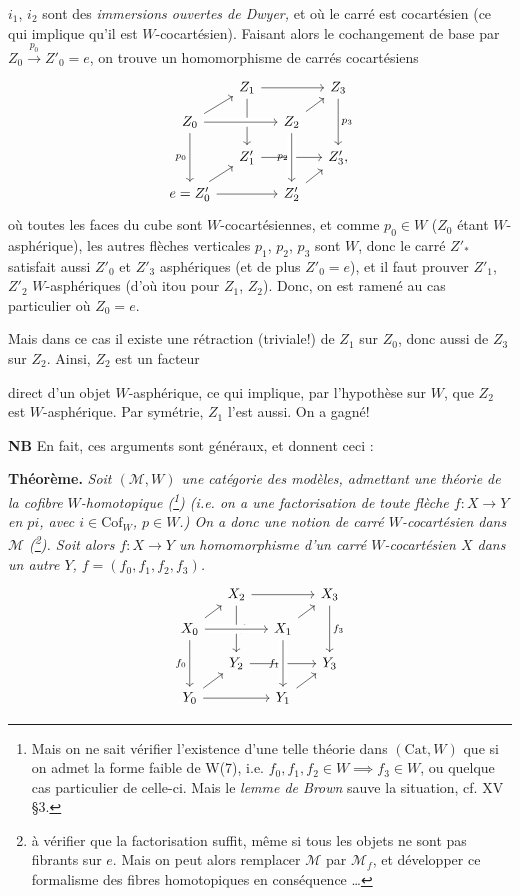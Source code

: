 \documentclass[11pt]{article}
\newcommand{\printedpage}[1]{\marginpar{\footnotesize p.~#1}}
\newcommand{\msp}[1]{\marginpar{\footnotesize [#1]}}
\newcommand{\Cof}{\mathrm{Cof}}
\begin{document}
$i_1$, $i_2$ sont des \textit{immersions ouvertes de Dwyer,} et où le carré est cocartésien (ce qui implique qu'il est $W$-cocartésien). Faisant alors le cochangement de base par $Z_0 \xrightarrow{p_0} Z'_0 = e$, on trouve un homomorphisme de carrés cocartésiens
\[
\begin{tikzcd}[column sep=small, row sep=small]
 & Z_1 \arrow[rr] \arrow[dd, "p_1"] & & Z_3 \arrow[dd, "p_3"] \\
Z_0 \arrow[ur] \arrow[rr, crossing over] \arrow[dd, "p_0"'] & & Z_2 \arrow[ur] & \\
 & Z'_1 \arrow[rr] & & Z'_3, \\
e = Z'_0 \arrow[ur] \arrow[rr] & & Z'_2 \arrow[ur] \arrow[from=uu, crossing over, "p_2"'] &
\end{tikzcd}
\]
où toutes les faces du cube sont $W$-cocartésiennes, et comme $p_0 \in W$ ($Z_0$ étant $W$-asphérique), les autres flèches verticales $p_1$, $p_2$, $p_3$ sont $W$, donc le carré $Z'_*$ satisfait aussi $Z'_0$ et $Z'_3$ asphériques (et de plus $Z'_0 = e$), et il faut prouver $Z'_1$, $Z'_2$ $W$-asphériques (d'où itou pour $Z_1$, $Z_2$). Donc, on est ramené au cas particulier où $Z_0 = e$.

Mais dans ce cas il existe une rétraction (triviale!) de $Z_1$ sur $Z_0$, donc aussi de $Z_3$ sur $Z_2$. Ainsi, $Z_2$ est un facteur

\msp{page 272}

direct d'un objet $W$-asphérique, ce qui implique, par l'hypothèse sur $W$, que $Z_2$ est $W$-asphérique. Par symétrie, $Z_1$ l'est aussi. On a gagné!

\textbf{NB} En fait, ces arguments sont généraux, et donnent ceci :

\setcounter{footnote}{136}
\textbf{Théorème.} \textit{Soit $(\mathcal{M}, W)$ une catégorie des modèles, admettant une théorie de la cofibre $W$-homotopique \textup{(}\footnote{Mais on ne sait vérifier l'existence d'une telle théorie dans $(\mathrm{Cat}, W)$ que si on admet la forme faible de W(7), i.e. $f_0, f_1, f_2 \in W \implies f_3 \in W$, ou quelque cas particulier de celle-ci. Mais le \textit{lemme de Brown} sauve la situation, cf. XV \S3.}\textup{)} (i.e. on a une factorisation de toute flèche $f : X \longrightarrow Y$ en $pi$, avec $i \in \Cof_W$, $p \in W$.) On a donc une notion de carré $W$-cocartésien dans $\mathcal{M}$ \textup{(}\footnote{à vérifier que la factorisation suffit, même si tous les objets ne sont pas fibrants sur $e$. Mais on peut alors remplacer $\mathcal{M}$ par $\mathcal{M}_f$, et développer ce formalisme des fibres homotopiques en conséquence \dots}\textup{)}. Soit
\printedpage{177}
alors $f : X \longrightarrow Y$ un homomorphisme d'un carré $W$-cocartésien $X$ dans un autre $Y$, $f = (f_0, f_1, f_2, f_3)$.}
\[
\begin{tikzcd}[column sep=small, row sep=small]
 & X_2 \arrow[rr] \arrow[dd, "f_2"] & & X_3 \arrow[dd, "f_3"] \\
X_0 \arrow[ur] \arrow[rr, crossing over] \arrow[dd, "f_0"'] & & X_1 \arrow[ur] & \\
 & Y_2 \arrow[rr] & & Y_3 \\
Y_0 \arrow[ur] \arrow[rr] & & Y_1 \arrow[ur] \arrow[from=uu, crossing over, "f_1"'] &
\end{tikzcd}
\]
\end{document}
